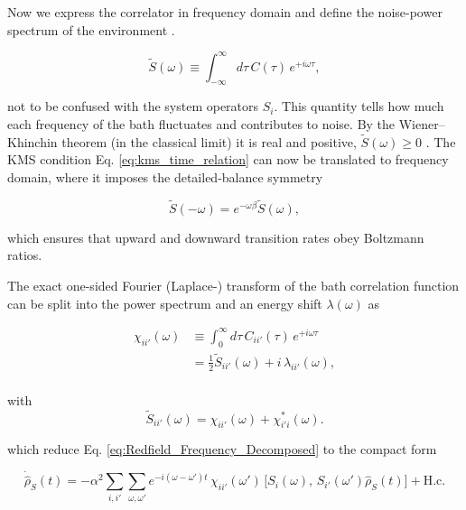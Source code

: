 \noindent
Now we express the correlator in frequency domain and define the noise-power spectrum of the environment \cite{lambertetal2024qutip5quantum}.

\begin{equation}
	\tilde{S}(\omega) \equiv \int_{-\infty}^{\infty} d\tau\, C(\tau)\, e^{+i \omega \tau},
	\label{eq:Noise_Power_Spectrum}
\end{equation}

\noindent
not to be confused with the system operators $S_i$.
This quantity tells how much each frequency of the bath fluctuates and contributes to noise. 
By the Wiener–Khinchin theorem (in the classical limit) it is real and positive, $\tilde{S}(\omega) \geq 0$ .
The KMS condition Eq. \eqref{eq:kms_time_relation} can now be translated to frequency domain, where it imposes the detailed-balance symmetry

\begin{equation}
	\tilde{S}(-\omega) = e^{-\omega \beta} \tilde{S}(\omega),
	\label{eq:kms_spectral_relation}
\end{equation}

\noindent
which ensures that upward and downward transition rates obey Boltzmann ratios.


\vspace{1em}
\noindent
The exact one-sided Fourier (Laplace-) transform of the bath correlation function can be split into the power spectrum and an energy shift $ \lambda(\omega)$ as

\begin{align}
	\chi_{ii'}(\omega) &\equiv \int_0^{\infty} d\tau\, C_{ii'}(\tau)\, e^{+i \omega \tau} \\
					   &= \tfrac{1}{2}\tilde{S}_{ii'}(\omega)+i\,\lambda_{ii'}(\omega), \\
\end{align}

\noindent
with 
\begin{equation}
	\tilde{S}_{ii'}(\omega)=\chi_{ii'}(\omega)+\chi_{i'i}^*(\omega).
	\label{eq:Redfield_Rates_Definition}
\end{equation}

\noindent
which reduce Eq. \eqref{eq:Redfield_Frequency_Decomposed} to the compact form

\begin{equation}
	\boxed{
	\dot{\hat{\rho}}_S(t)
	= -\alpha^2 \sum_{i,i'} \sum_{\omega,\omega'} e^{-i(\omega - \omega')t}
	\, \chi_{ii'}(\omega') \,
	\big[ S_i(\omega),\, S_{i'}(\omega') \hat{\rho}_S(t) \big]
	+ \text{H.c.}
	}
\end{equation}

